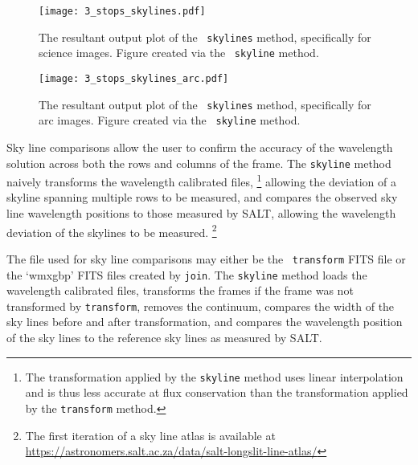 \begin{figure}[t]
    \centering
    \texttt{[image: 3\_stops\_skylines.pdf]}
    \caption{The resultant output plot of the \stops\ \texttt{skylines} method, specifically for science images. Figure created via the \stops\ \texttt{skyline} method.}
    \label{fig:stops_sky_eg}
\end{figure}
\begin{figure}[t]
    \centering
    \texttt{[image: 3\_stops\_skylines\_arc.pdf]}
    \caption{The resultant output plot of the \stops\ \texttt{skylines} method, specifically for arc images. Figure created via the \stops\ \texttt{skyline} method.}
    \label{fig:stops_sky__arc_eg}
\end{figure}

Sky line comparisons allow the user to confirm the accuracy of the wavelength solution across both the rows and columns of the frame. The \texttt{skyline} method naively transforms the wavelength calibrated files,%
\footnote{The transformation applied by the \texttt{skyline} method uses linear interpolation and is thus less accurate at flux conservation than the transformation applied by the \texttt{transform} method.}
allowing the deviation of a skyline spanning multiple rows to be measured, and compares the observed sky line wavelength positions to those measured by \gls{SALT}, allowing the wavelength deviation of the skylines to be measured.%
\footnote{The first iteration of a sky line atlas is available at \url{https://astronomers.salt.ac.za/data/salt-longslit-line-atlas/}}

The file used for sky line comparisons may either be the \iraf\ \texttt{transform} \gls{FITS} file or the `wmxgbp' \gls{FITS} files created by \texttt{join}. The \texttt{skyline} method loads the wavelength calibrated files, transforms the frames if the frame was not transformed by \texttt{transform}, removes the continuum, compares the width of the sky lines before and after transformation, and compares the wavelength position of the sky lines to the reference sky lines as measured by \gls{SALT}.


